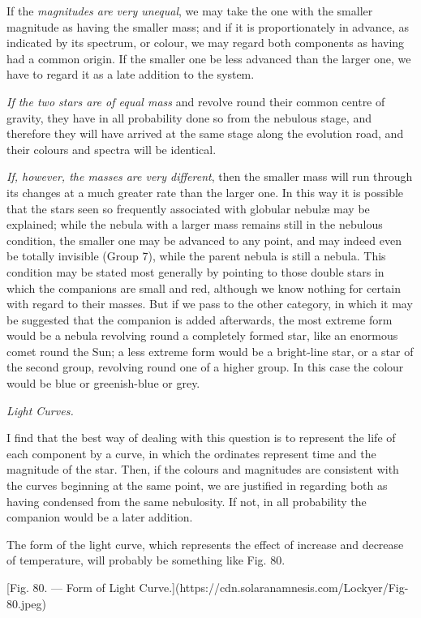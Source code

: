 \documentclass[a4paper, 12pt, oneside, polutonikogreek, english]{article}
\begin{document}
If the \emph{magnitudes are very unequal}, we may take the one with the smaller magnitude as having the smaller mass; and if it is proportionately in advance, as indicated by its spectrum, or colour, we may regard both components as having had a common origin. If the smaller one be less advanced than the larger one, we have to regard it as a late addition to the system.

\emph{If the two stars are of equal mass} and revolve round their common centre of gravity, they have in all probability done so from the nebulous stage, and therefore they will have arrived at the same stage along the evolution road, and their colours and spectra will be identical.

\emph{If, however, the masses are very different}, then the smaller mass will run through its changes at a much greater rate than the larger one. In this way it is possible that the stars seen so frequently associated with globular nebulæ may be explained; while the nebula with a larger mass remains still in the nebulous condition, the smaller one may be advanced to any point, and may indeed even be totally invisible (Group 7), while the parent nebula is still a nebula. This condition may be stated most generally by pointing to those double stars in which the companions are small and red, although we know nothing for certain with regard to their masses. But if we pass to the other category, in which it may be suggested that the companion is added afterwards, the most extreme form would be a nebula revolving round a completely formed star, like an enormous comet round the Sun; a less extreme form would be a bright-line star, or a star of the second group, revolving round one of a higher group. In this case the colour would be blue or greenish-blue or grey.

\emph{Light Curves.}

I find that the best way of dealing with this question is to represent the life of each component by a curve, in which the ordinates represent time and the magnitude of the star. Then, if the colours and magnitudes are consistent with the curves beginning at the same point, we are justified in regarding both as having condensed from the same nebulosity. If not, in all probability the companion would be a later addition.

The form of the light curve, which represents the effect of increase and decrease of temperature, will probably be something like Fig. 80.

[Fig. 80. --- Form of Light Curve.](https://cdn.solaranamnesis.com/Lockyer/Fig-80.jpeg)
\end{document}
